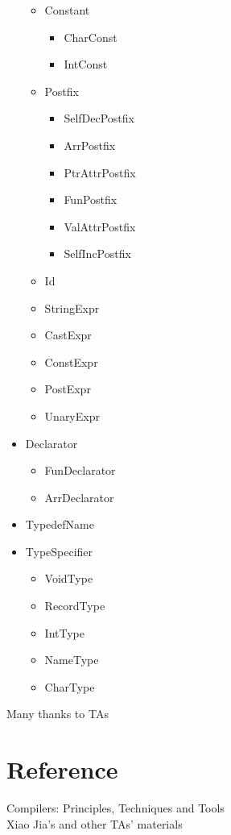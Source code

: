 \documentclass[nocopyrightspace]{sigplanconf}
\begin{document}
\begin{itemize}
\begin{itemize}
		\item Constant
		\begin{itemize}
			\item CharConst
			\item IntConst
		\end{itemize}

		\item Postfix
		\begin{itemize}
			\item SelfDecPostfix
			\item ArrPostfix
			\item PtrAttrPostfix
			\item FunPostfix
			\item ValAttrPostfix
			\item SelfIncPostfix
		\end{itemize}

		\item Id
		\item StringExpr
		\item CastExpr
		\item ConstExpr
		\item PostExpr
		\item UnaryExpr
	\end{itemize}

	\item Declarator
	\begin{itemize}
		\item FunDeclarator
		\item ArrDeclarator
	\end{itemize}

	\item TypedefName
	\item TypeSpecifier
	\begin{itemize}
		\item VoidType
		\item RecordType
		\item IntType
		\item NameType
		\item CharType
	\end{itemize}

\end{itemize}

\acks

Many thanks to TAs




\section*{Reference}
Compilers: Principles, Techniques and Tools\\
Xiao Jia's and other TAs' materials\\
\end{document}
